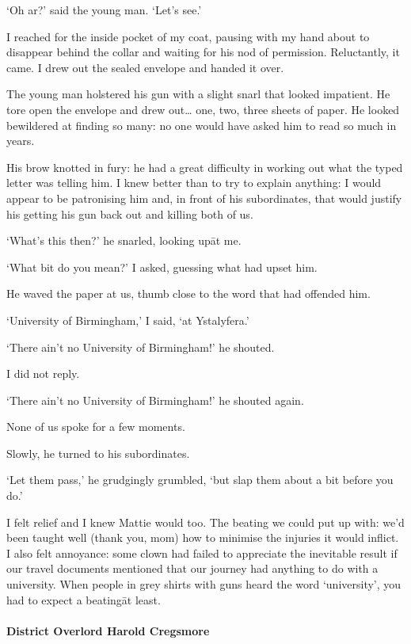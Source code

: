 ‘Oh ar?’ said the young man.  ‘Let’s see.’

I reached for the inside pocket of my coat, pausing with my hand about
to disappear behind the collar and waiting for his nod of permission.
Reluctantly, it came.  I drew out the sealed envelope and handed it
over.

The young man holstered his gun with a slight snarl that looked
impatient.  He tore open the envelope and drew out… one, two, three
sheets of paper.  He looked bewildered at finding so many: no one
would have asked him to read so much in years.

His brow knotted in fury: he had a great difficulty in working out
what the typed letter was telling him.  I knew better than to try to
explain anything: I would appear to be patronising him and, in front
of his subordinates, that would justify his getting his gun back out
and killing both of us.

‘What’s this then?’ he snarled, looking up\=at me.

‘What bit do you mean?’ I asked, guessing what had upset him.

He waved the paper at us, thumb close to the word that had offended him.

‘University of Birmingham,’ I said, ‘at Ystalyfera.’

‘There ain’t no University of Birmingham!’ he shouted.

I did not reply.

‘There ain’t no University of Birmingham!’ he shouted again.

None of us spoke for a few moments.

Slowly, he turned to his subordinates.

‘Let them pass,’ he grudgingly grumbled, ‘but slap them about a bit
before you do.’

I felt relief and I knew Mattie would too.  The beating we could put
up with: we’d been taught well (thank you, mom) %
how to minimise the
injuries it would inflict.  I also felt annoyance: some clown had
failed to appreciate the inevitable result if our travel documents
mentioned that our journey had anything to do with a university.  When
people in grey shirts with guns heard the word ‘university’, you had
to expect a beating\=at least.

\fugue

\paragraph{District Overlord Harold Cregsmore}\strut

